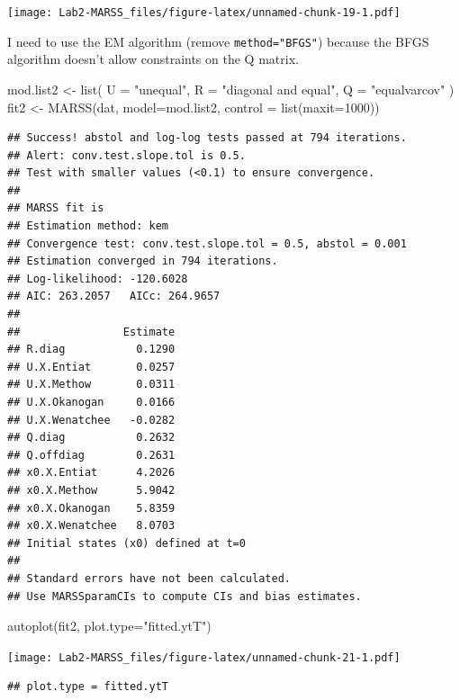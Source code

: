 \documentclass[
]{article}
\newenvironment{Shaded}{\begin{snugshade}}{\end{snugshade}}
\newcommand{\AttributeTok}[1]{\textcolor[rgb]{0.77,0.63,0.00}{#1}}
\newcommand{\DecValTok}[1]{\textcolor[rgb]{0.00,0.00,0.81}{#1}}
\newcommand{\FunctionTok}[1]{\textcolor[rgb]{0.00,0.00,0.00}{#1}}
\newcommand{\NormalTok}[1]{#1}
\newcommand{\OtherTok}[1]{\textcolor[rgb]{0.56,0.35,0.01}{#1}}
\newcommand{\StringTok}[1]{\textcolor[rgb]{0.31,0.60,0.02}{#1}}
\begin{document}
\texttt{[image: Lab2-MARSS\_files/figure-latex/unnamed-chunk-19-1.pdf]}

I need to use the EM algorithm (remove \texttt{method="BFGS"}) because
the BFGS algorithm doesn't allow constraints on the Q matrix.

\begin{Shaded}
\begin{Highlighting}[]
\NormalTok{mod.list2 }\OtherTok{\textless{}{-}} \FunctionTok{list}\NormalTok{(}
  \AttributeTok{U =} \StringTok{"unequal"}\NormalTok{,}
  \AttributeTok{R =} \StringTok{"diagonal and equal"}\NormalTok{,}
  \AttributeTok{Q =} \StringTok{"equalvarcov"}
\NormalTok{)}
\NormalTok{fit2 }\OtherTok{\textless{}{-}} \FunctionTok{MARSS}\NormalTok{(dat, }\AttributeTok{model=}\NormalTok{mod.list2, }\AttributeTok{control =} \FunctionTok{list}\NormalTok{(}\AttributeTok{maxit=}\DecValTok{1000}\NormalTok{))}
\end{Highlighting}
\end{Shaded}

\begin{verbatim}
## Success! abstol and log-log tests passed at 794 iterations.
## Alert: conv.test.slope.tol is 0.5.
## Test with smaller values (<0.1) to ensure convergence.
## 
## MARSS fit is
## Estimation method: kem 
## Convergence test: conv.test.slope.tol = 0.5, abstol = 0.001
## Estimation converged in 794 iterations. 
## Log-likelihood: -120.6028 
## AIC: 263.2057   AICc: 264.9657   
##  
##                Estimate
## R.diag           0.1290
## U.X.Entiat       0.0257
## U.X.Methow       0.0311
## U.X.Okanogan     0.0166
## U.X.Wenatchee   -0.0282
## Q.diag           0.2632
## Q.offdiag        0.2631
## x0.X.Entiat      4.2026
## x0.X.Methow      5.9042
## x0.X.Okanogan    5.8359
## x0.X.Wenatchee   8.0703
## Initial states (x0) defined at t=0
## 
## Standard errors have not been calculated. 
## Use MARSSparamCIs to compute CIs and bias estimates.
\end{verbatim}

\begin{Shaded}
\begin{Highlighting}[]
\FunctionTok{autoplot}\NormalTok{(fit2, }\AttributeTok{plot.type=}\StringTok{"fitted.ytT"}\NormalTok{)}
\end{Highlighting}
\end{Shaded}

\texttt{[image: Lab2-MARSS\_files/figure-latex/unnamed-chunk-21-1.pdf]}

\begin{verbatim}
## plot.type = fitted.ytT
\end{verbatim}
\end{document}
